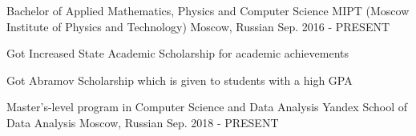 \begin{cventries}
  \cventry
    {Bachelor of Applied Mathematics, Physics and Computer Science}
    {MIPT (Moscow Institute of Physics and Technology) }
    {Moscow, Russian}
    {Sep. 2016 - PRESENT}
    {
      \begin{cvitems}
        \item {Got Increased State Academic Scholarship for academic achievements}
        \item {Got Abramov Scholarship which is given to students with a high GPA}
      \end{cvitems}
    }
  \cventry
    {Master’s-level program in Computer Science and Data Analysis}
    {Yandex School of Data Analysis}
    {Moscow, Russian}
    {Sep. 2018 - PRESENT}
    {
    }
    

\end{cventries}
